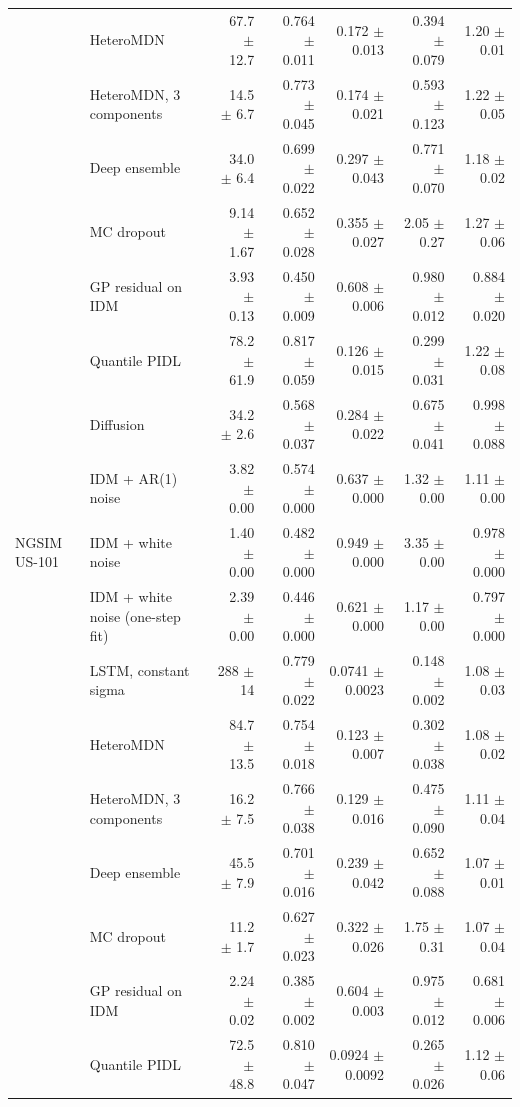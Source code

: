 \begin{longtable}{llrrrrr}
 & HeteroMDN & 67.7 $\pm$ 12.7 & 0.764 $\pm$ 0.011 & 0.172 $\pm$ 0.013 & 0.394 $\pm$ 0.079 & 1.20 $\pm$ 0.01 \\
 & HeteroMDN, 3 components & 14.5 $\pm$ 6.7 & 0.773 $\pm$ 0.045 & 0.174 $\pm$ 0.021 & 0.593 $\pm$ 0.123 & 1.22 $\pm$ 0.05 \\
 & Deep ensemble & 34.0 $\pm$ 6.4 & 0.699 $\pm$ 0.022 & 0.297 $\pm$ 0.043 & 0.771 $\pm$ 0.070 & 1.18 $\pm$ 0.02 \\
 & MC dropout & 9.14 $\pm$ 1.67 & 0.652 $\pm$ 0.028 & 0.355 $\pm$ 0.027 & 2.05 $\pm$ 0.27 & 1.27 $\pm$ 0.06 \\
 & GP residual on IDM & 3.93 $\pm$ 0.13 & 0.450 $\pm$ 0.009 & 0.608 $\pm$ 0.006 & 0.980 $\pm$ 0.012 & 0.884 $\pm$ 0.020 \\
 & Quantile PIDL & 78.2 $\pm$ 61.9 & 0.817 $\pm$ 0.059 & 0.126 $\pm$ 0.015 & 0.299 $\pm$ 0.031 & 1.22 $\pm$ 0.08 \\
 & Diffusion & 34.2 $\pm$ 2.6 & 0.568 $\pm$ 0.037 & 0.284 $\pm$ 0.022 & 0.675 $\pm$ 0.041 & 0.998 $\pm$ 0.088 \\
 & IDM + AR(1) noise & 3.82 $\pm$ 0.00 & 0.574 $\pm$ 0.000 & 0.637 $\pm$ 0.000 & 1.32 $\pm$ 0.00 & 1.11 $\pm$ 0.00 \\
\midrule
NGSIM US-101 & IDM + white noise & 1.40 $\pm$ 0.00 & 0.482 $\pm$ 0.000 & 0.949 $\pm$ 0.000 & 3.35 $\pm$ 0.00 & 0.978 $\pm$ 0.000 \\
 & IDM + white noise (one-step fit) & 2.39 $\pm$ 0.00 & 0.446 $\pm$ 0.000 & 0.621 $\pm$ 0.000 & 1.17 $\pm$ 0.00 & 0.797 $\pm$ 0.000 \\
 & LSTM, constant sigma & 288 $\pm$ 14 & 0.779 $\pm$ 0.022 & 0.0741 $\pm$ 0.0023 & 0.148 $\pm$ 0.002 & 1.08 $\pm$ 0.03 \\
 & HeteroMDN & 84.7 $\pm$ 13.5 & 0.754 $\pm$ 0.018 & 0.123 $\pm$ 0.007 & 0.302 $\pm$ 0.038 & 1.08 $\pm$ 0.02 \\
 & HeteroMDN, 3 components & 16.2 $\pm$ 7.5 & 0.766 $\pm$ 0.038 & 0.129 $\pm$ 0.016 & 0.475 $\pm$ 0.090 & 1.11 $\pm$ 0.04 \\
 & Deep ensemble & 45.5 $\pm$ 7.9 & 0.701 $\pm$ 0.016 & 0.239 $\pm$ 0.042 & 0.652 $\pm$ 0.088 & 1.07 $\pm$ 0.01 \\
 & MC dropout & 11.2 $\pm$ 1.7 & 0.627 $\pm$ 0.023 & 0.322 $\pm$ 0.026 & 1.75 $\pm$ 0.31 & 1.07 $\pm$ 0.04 \\
 & GP residual on IDM & 2.24 $\pm$ 0.02 & 0.385 $\pm$ 0.002 & 0.604 $\pm$ 0.003 & 0.975 $\pm$ 0.012 & 0.681 $\pm$ 0.006 \\
 & Quantile PIDL & 72.5 $\pm$ 48.8 & 0.810 $\pm$ 0.047 & 0.0924 $\pm$ 0.0092 & 0.265 $\pm$ 0.026 & 1.12 $\pm$ 0.06 \\

\end{longtable}
